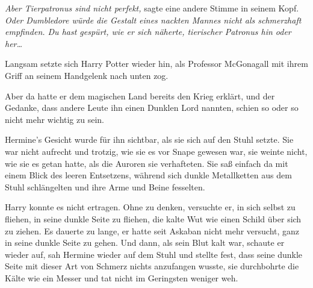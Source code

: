 \emph{Aber Tierpatronus sind nicht perfekt,} sagte eine andere Stimme in seinem Kopf. \emph{Oder Dumbledore würde die Gestalt eines nackten Mannes nicht als schmerzhaft empfinden. Du hast gespürt, wie er sich näherte, tierischer Patronus hin oder her…}

Langsam setzte sich Harry Potter wieder hin, als Professor McGonagall mit ihrem Griff an seinem Handgelenk nach unten zog.

Aber da hatte er dem magischen Land bereits den Krieg erklärt, und der Gedanke, dass andere Leute ihn einen Dunklen Lord nannten, schien so oder so nicht mehr wichtig zu sein.

Hermine's Gesicht wurde für ihn sichtbar, als sie sich auf den Stuhl setzte. Sie war nicht aufrecht und trotzig, wie sie es vor Snape gewesen war, sie weinte nicht, wie sie es getan hatte, als die Auroren sie verhafteten. Sie saß einfach da mit einem Blick des leeren Entsetzens, während sich dunkle Metallketten aus dem Stuhl schlängelten und ihre Arme und Beine fesselten.

Harry konnte es nicht ertragen. Ohne zu denken, versuchte er, in sich selbst zu fliehen, in seine dunkle Seite zu fliehen, die kalte Wut wie einen Schild über sich zu ziehen. Es dauerte zu lange, er hatte seit Askaban nicht mehr versucht, ganz in seine dunkle Seite zu gehen. Und dann, als sein Blut kalt war, schaute er wieder auf, sah Hermine wieder auf dem Stuhl und stellte fest, dass seine dunkle Seite mit dieser Art von Schmerz nichts anzufangen wusste, sie durchbohrte die Kälte wie ein Messer und tat nicht im Geringsten weniger weh.

